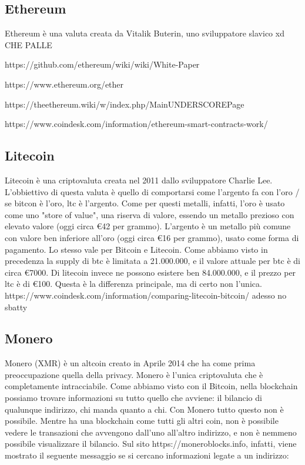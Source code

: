 \documentclass {article}
\begin{document}
\subsection {Ethereum}


Ethereum è una valuta creata da Vitalik Buterin, uno sviluppatore slavico xd CHE PALLE

https://github.com/ethereum/wiki/wiki/White-Paper

https://www.ethereum.org/ether

https://theethereum.wiki/w/index.php/MainUNDERSCOREPage

https://www.coindesk.com/information/ethereum-smart-contracts-work/


\subsection {Litecoin}


Litecoin è una criptovaluta creata nel 2011 dallo sviluppatore Charlie Lee. L'obbiettivo di questa valuta è quello di comportarsi come l'argento fa con l'oro  /  se bitcon è l'oro, ltc è l'argento.
Come per questi metalli, infatti, l'oro è usato come uno "store of value", una riserva di valore, essendo un metallo prezioso con elevato valore (oggi circa \euro{}42 per grammo). L'argento è un metallo più comune con valore ben inferiore all'oro (oggi circa \euro{}16 per grammo), usato come forma di pagamento.
Lo stesso vale per Bitcoin e Litecoin. Come abbiamo visto in precedenza la supply di btc è limitata a 21.000.000, e il valore attuale per btc è di circa \euro{}7000. Di litecoin invece ne possono esistere ben 84.000.000, e il prezzo per ltc è di \euro{}100.
Questa è la differenza principale, ma di certo non l'unica.
https://www.coindesk.com/information/comparing-litecoin-bitcoin/ adesso no sbatty

\subsection {Monero}


Monero (XMR) è un altcoin creato in Aprile 2014 che ha come prima preoccupazione quella della privacy.
Monero è l'unica criptovaluta che è completamente intracciabile. Come abbiamo visto con il Bitcoin, nella blockchain possiamo trovare informazioni su tutto quello che avviene: il bilancio di qualunque indirizzo, chi manda quanto a chi.
Con Monero tutto questo non è possibile. Mentre ha una blockchain come tutti gli altri coin, non è possibile vedere le transazioni che avvengono dall'uno all'altro indirizzo, e non è nemmeno possibile visualizzare il bilancio.
Sul sito https://moneroblocks.info, infatti, viene mostrato il seguente messaggio se si cercano informazioni legate a un indirizzo:\\
\end{document}

